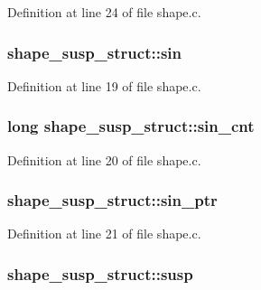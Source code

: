 Definition at line 24 of file shape.\+c.

\subsubsection[{\texorpdfstring{sin}{sin}}]{ shape\+\_\+susp\+\_\+struct\+::sin}\hypertarget{structshape__susp__struct_ad565bc4145f7df57e5ffb45f86d71bdc}{}\label{structshape__susp__struct_ad565bc4145f7df57e5ffb45f86d71bdc}


Definition at line 19 of file shape.\+c.

\subsubsection[{\texorpdfstring{sin\+\_\+cnt}{sin_cnt}}]{\setlength{\rightskip}{0pt plus 5cm}long shape\+\_\+susp\+\_\+struct\+::sin\+\_\+cnt}\hypertarget{structshape__susp__struct_ac06b6b21f0f142378fdb84559deae8f0}{}\label{structshape__susp__struct_ac06b6b21f0f142378fdb84559deae8f0}


Definition at line 20 of file shape.\+c.

\subsubsection[{\texorpdfstring{sin\+\_\+ptr}{sin_ptr}}]{ shape\+\_\+susp\+\_\+struct\+::sin\+\_\+ptr}\hypertarget{structshape__susp__struct_a01afbf2e27c587306c48f9b5a157b04d}{}\label{structshape__susp__struct_a01afbf2e27c587306c48f9b5a157b04d}


Definition at line 21 of file shape.\+c.

\subsubsection[{\texorpdfstring{susp}{susp}}]{ shape\+\_\+susp\+\_\+struct\+::susp}\hypertarget{structshape__susp__struct_ab57aff7b90b07486dd0532b2bc5dce82}{}\label{structshape__susp__struct_ab57aff7b90b07486dd0532b2bc5dce82}


